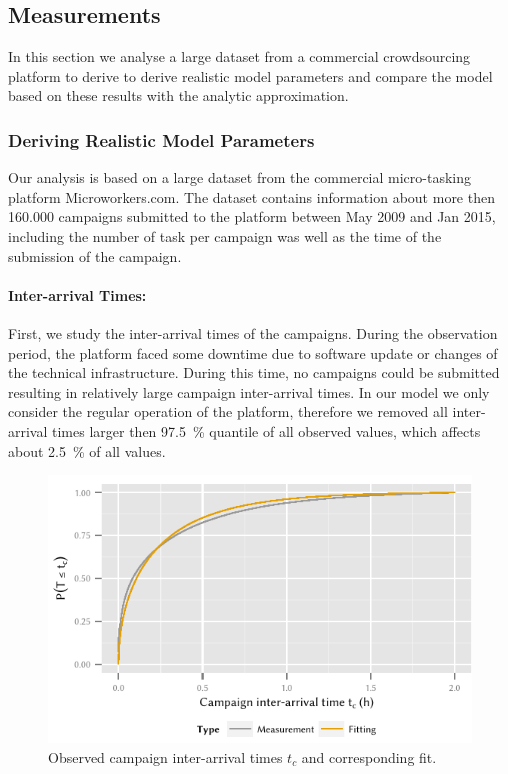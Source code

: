\subsection{Measurements}\label{sec:cloud:crowdsourcing:measurements}
In this section we analyse a large dataset from a commercial crowdsourcing platform to derive to derive realistic model parameters and compare the model based on these results with the analytic approximation.

\subsubsection*{Deriving Realistic Model Parameters}
Our analysis is based on a large dataset from the commercial micro-tasking platform Microworkers.com.
The dataset contains information about more then 160.000 campaigns submitted to the platform between May 2009 and Jan 2015, including the number of task per campaign was well as the time of the submission of the campaign.  

\paragraph*{Inter-arrival Times:} First, we study the inter-arrival times of the campaigns.
During the observation period, the platform faced some downtime due to software update or changes of the technical infrastructure.
During this time, no campaigns could be submitted resulting in relatively large campaign inter-arrival times.
In our model we only consider the regular operation of the platform, therefore we removed all inter-arrival times larger then \SI{97.5}{\percent} quantile of all observed values, which affects about \SI{2.5}{\percent} of all values.

\begin{figure}
  \centering
  \includegraphics{cloud/crowdsourcing/measurements/figures/campaign_interarrival}
  \caption{Observed campaign inter-arrival times \(t_c\) and corresponding fit.}
  \label{fig:cloud:crowdsourcing:measurements:parameters:campaign_interarrival}
\end{figure}

